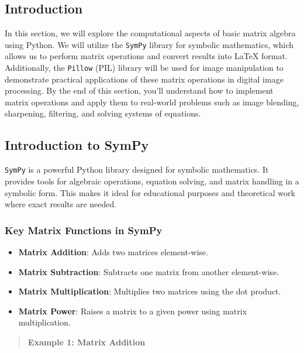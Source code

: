 \documentclass[
  letterpaper,
  DIV=11,
  numbers=noendperiod]{scrreprt}
\providecommand{\tightlist}{%
  \setlength{\itemsep}{0pt}\setlength{\parskip}{0pt}}\usepackage{longtable,booktabs,array}
\theoremstyle{plain}
\theoremstyle{definition}
\theoremstyle{remark}
\begin{document}
\subsection{Introduction}\label{introduction-1}

In this section, we will explore the computational aspects of basic
matrix algebra using Python. We will utilize the \texttt{SymPy} library
for symbolic mathematics, which allows us to perform matrix operations
and convert results into LaTeX format. Additionally, the \texttt{Pillow}
(PIL) library will be used for image manipulation to demonstrate
practical applications of these matrix operations in digital image
processing. By the end of this section, you'll understand how to
implement matrix operations and apply them to real-world problems such
as image blending, sharpening, filtering, and solving systems of
equations.

\subsection{Introduction to SymPy}\label{introduction-to-sympy}

\texttt{SymPy} is a powerful Python library designed for symbolic
mathematics. It provides tools for algebraic operations, equation
solving, and matrix handling in a symbolic form. This makes it ideal for
educational purposes and theoretical work where exact results are
needed.

\subsubsection{Key Matrix Functions in
SymPy}\label{key-matrix-functions-in-sympy}

\begin{itemize}
\tightlist
\item
  \textbf{Matrix Addition}: Adds two matrices element-wise.
\item
  \textbf{Matrix Subtraction}: Subtracts one matrix from another
  element-wise.
\item
  \textbf{Matrix Multiplication}: Multiplies two matrices using the dot
  product.
\item
  \textbf{Matrix Power}: Raises a matrix to a given power using matrix
  multiplication.
\end{itemize}

\begin{quote}
\textbf{Example 1: Matrix Addition}
\end{quote}
\end{document}
